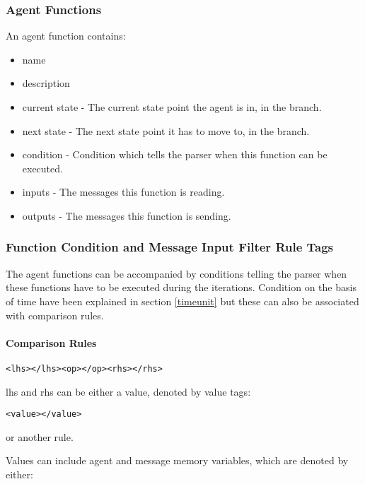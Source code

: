 \subsubsection{Agent Functions}
An agent function contains:
\begin{itemize}
\item name
\item description
\item current state - The current state point the agent is in, in
the branch.
\item next state - The next state point it has to move to, in the
branch.
\item condition - Condition which tells the parser when this
function can be executed.
\item inputs - The messages this function is reading.
\item outputs - The messages this function is sending.
\end{itemize}

\subsubsection{Function Condition and Message Input Filter Rule
Tags}\label{functioncond}

The agent functions can be accompanied by conditions telling the
parser when these functions have to be executed during the
iterations. Condition on the basis of time have been explained in
section \ref{timeunit} but these can also be associated with
comparison rules.

\paragraph{Comparison Rules}

\begin{mylisting}
\begin{verbatim}
<lhs></lhs><op></op><rhs></rhs>
\end{verbatim}
\end{mylisting}

lhs and rhs can be either a value, denoted by value tags:

\begin{mylisting}
\begin{verbatim}
<value></value>
\end{verbatim}
\end{mylisting}

or another rule.

Values can include agent and message memory variables, which are denoted by either:

